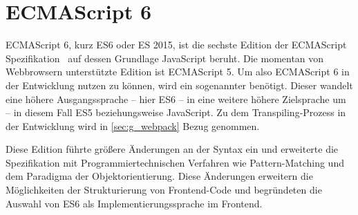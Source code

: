\section{ECMAScript 6}
\label{sec:g_ecma_script_6}

ECMAScript 6, kurz ES6 oder ES 2015, ist die sechste Edition der ECMAScript
Spezifikation~\cite{es6} auf dessen Grundlage JavaScript beruht.  Die momentan
von Webbrowsern unterstützte Edition ist ECMAScript 5.  Um also ECMAScript 6 in
der Entwicklung nutzen zu können, wird ein sogenannter 
benötigt.  Dieser wandelt eine höhere Ausgangssprache -- hier ES6 -- in eine
weitere höhere Zielsprache um -- in diesem Fall ES5 beziehungsweise JavaScript.
Zu dem Transpiling-Prozess in der Entwicklung wird in \cref{sec:g_webpack} Bezug
genommen.

Diese Edition führte größere Änderungen an der Syntax ein und erweiterte die
Spezifikation mit Programmiertechnischen Verfahren wie Pattern-Matching und dem
Paradigma der Objektorientierung.  Diese Änderungen erweitern die Möglichkeiten
der Strukturierung von Frontend-Code und begründeten die Auswahl von ES6 als
Implementierungssprache im Frontend.





